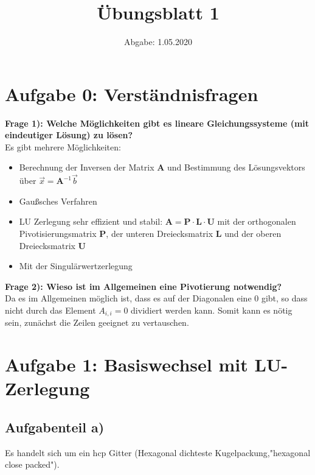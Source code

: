 

\subject{Computational Physics}
\title{Übungsblatt 1}
\date{%
  Abgabe: 1.05.2020
}



\maketitle
\thispagestyle{empty}
\newpage

\section*{Aufgabe 0: Verständnisfragen}

\textbf{Frage 1): Welche Möglichkeiten gibt es lineare Gleichungssysteme (mit eindeutiger Lösung) zu lösen?}\\

Es gibt mehrere Möglichkeiten:
\begin{itemize}
  \item Berechnung der Inversen der Matrix $\symbf{A}$ und Bestimmung des Lösungsvektors über $\vec{x}=\symbf{A}^{-1}\vec{b}$
  \item Gaußsches Verfahren
  \item LU Zerlegung \to sehr effizient und stabil: $\symbf{A}=\symbf{P}\cdot \symbf{L}\cdot \symbf{U}$ mit
  der orthogonalen Pivotisierungsmatrix $\symbf{P}$, der unteren Dreiecksmatrix $\symbf{L}$ und der
  oberen Dreiecksmatrix $\symbf{U}$
  \item Mit der Singulärwertzerlegung
\end{itemize}

\textbf{Frage 2): Wieso ist im Allgemeinen eine Pivotierung notwendig?}\\
Da es im Allgemeinen möglich ist, dass es auf der Diagonalen eine 0 gibt, so dass nicht durch das Element $A_{i,i}=0$ dividiert werden kann. Somit kann es nötig sein, zunächst die Zeilen geeignet zu vertauschen.


\section*{Aufgabe 1: Basiswechsel mit LU-Zerlegung}
\subsection*{Aufgabenteil a)}
Es handelt sich um ein hcp Gitter (Hexagonal dichteste Kugelpackung,"hexagonal close packed").
